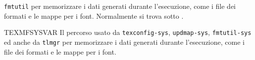 \documentclass{article}
\begin{document}
\begin{ttdescription}
  \verb+fmtutil+ per memorizzare i dati generati durante l'esecuzione,
  come i file dei formati e le mappe per i font. Normalmente si trova
  sotto .
\item [TEXMFSYSVAR] Il percorso usato da \verb+texconfig-sys+,
  \verb+updmap-sys+, \verb+fmtutil-sys+ ed anche da \verb+tlmgr+ per
  memorizzare i dati generati durante l'esecuzione, come i file dei
  formati e le mappe per i font.
\end{ttdescription}
\end{document}
